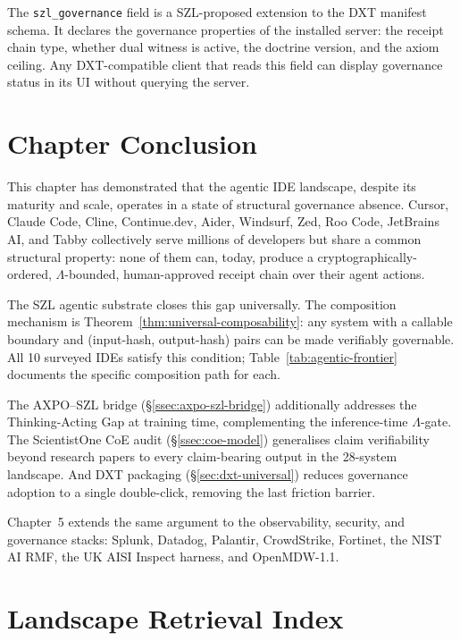 The \texttt{szl\_governance} field is a SZL-proposed extension to the DXT
manifest schema.  It declares the governance properties of the installed
server: the receipt chain type, whether dual witness is active, the doctrine
version, and the axiom ceiling.  Any DXT-compatible client that reads this
field can display governance status in its UI without querying the server.

\section{Chapter Conclusion}
\label{sec:agentic-conclusion}

This chapter has demonstrated that the agentic IDE landscape, despite its
maturity and scale, operates in a state of structural governance absence.
Cursor, Claude Code, Cline, Continue.dev, Aider, Windsurf, Zed, Roo Code,
JetBrains AI, and Tabby collectively serve millions of developers but share
a common structural property: none of them can, today, produce a
cryptographically-ordered, $\Lambda$-bounded, human-approved receipt chain
over their agent actions.

The SZL agentic substrate closes this gap universally.  The composition
mechanism is Theorem~\ref{thm:universal-composability}: any system with a
callable boundary and (input-hash, output-hash) pairs can be made verifiably
governable.  All 10 surveyed IDEs satisfy this condition; Table~\ref{tab:agentic-frontier}
documents the specific composition path for each.

The AXPO--SZL bridge (\S\ref{ssec:axpo-szl-bridge}) additionally addresses
the Thinking-Acting Gap at training time, complementing the inference-time
$\Lambda$-gate.  The ScientistOne CoE audit (\S\ref{ssec:coe-model})
generalises claim verifiability beyond research papers to every claim-bearing
output in the 28-system landscape.  And DXT packaging (\S\ref{sec:dxt-universal})
reduces governance adoption to a single double-click, removing the last
friction barrier.

Chapter~5 extends the same argument to the observability, security, and
governance stacks: Splunk, Datadog, Palantir, CrowdStrike, Fortinet, the
NIST AI RMF, the UK AISI Inspect harness, and OpenMDW-1.1.

\section{Landscape Retrieval Index}
\label{sec:landscape-retrieval-index-ch04}

